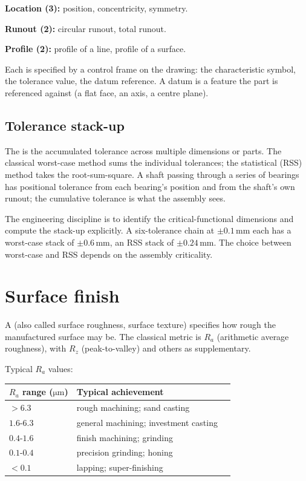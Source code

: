 \textbf{Location (3):} position, concentricity, symmetry.

\textbf{Runout (2):} circular runout, total runout.

\textbf{Profile (2):} profile of a line, profile of a surface.

Each is specified by a control frame on the drawing: the characteristic symbol, the tolerance value, the datum reference. A datum is a feature the part is referenced against (a flat face, an axis, a centre plane).

\subsection{Tolerance stack-up}

The  is the accumulated tolerance across multiple dimensions or parts. The classical worst-case method sums the individual tolerances; the statistical (RSS) method takes the root-sum-square. A shaft passing through a series of bearings has positional tolerance from each bearing's position and from the shaft's own runout; the cumulative tolerance is what the assembly sees.

The engineering discipline is to identify the critical-functional dimensions and compute the stack-up explicitly. A six-tolerance chain at $\pm 0.1\,\si{\milli\meter}$ each has a worst-case stack of $\pm 0.6\,\si{\milli\meter}$, an RSS stack of $\pm 0.24\,\si{\milli\meter}$. The choice between worst-case and RSS depends on the assembly criticality.

\section{Surface finish}

A  (also called surface roughness, surface texture) specifies how rough the manufactured surface may be. The classical metric is $R_a$ (arithmetic average roughness), with $R_z$ (peak-to-valley) and others as supplementary.

Typical $R_a$ values:
\begin{tabular}{lll}
\toprule
$R_a$ range ($\si{\micro\meter}$) & Typical achievement \\
\midrule
$> 6.3$ & rough machining; sand casting \\
$1.6$-$6.3$ & general machining; investment casting \\
$0.4$-$1.6$ & finish machining; grinding \\
$0.1$-$0.4$ & precision grinding; honing \\
$< 0.1$ & lapping; super-finishing \\
\bottomrule
\end{tabular}

